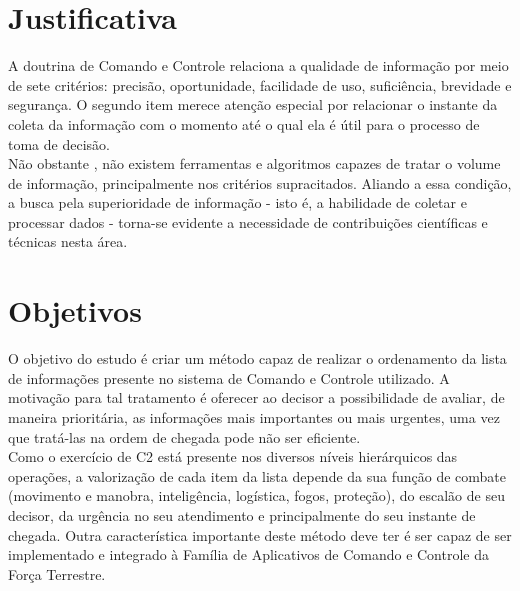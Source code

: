 \documentclass[a4paper,12pt]{article}
\begin{document}
\section{Justificativa}
A doutrina de Comando e Controle \cite{Brasil} relaciona a qualidade de informação por meio de sete critérios: precisão, oportunidade, facilidade de uso,
suficiência, brevidade e segurança. O segundo item merece atenção especial por relacionar o instante da coleta da informação com o momento até o qual ela é 
útil para o processo de toma de decisão.\\
\indent Não obstante \cite{Savas 2014}, não existem ferramentas e algoritmos capazes de tratar o volume de informação, principalmente nos critérios supracitados. 
Aliando a essa condição, a busca pela superioridade de informação - isto é, a habilidade de coletar e processar dados - torna-se evidente a necessidade de
contribuições científicas e técnicas nesta área.

\section{Objetivos}
\indent O objetivo do estudo é criar um método capaz de realizar o ordenamento da lista de informações presente no sistema de 
Comando e Controle utilizado. A motivação para tal tratamento é oferecer ao decisor a possibilidade de avaliar, de maneira 
prioritária, as informações mais importantes ou mais urgentes, uma vez que tratá-las na ordem de chegada pode não ser 
eficiente.\\
\indent Como o exercício de C2 está presente nos diversos níveis hierárquicos das operações, a valorização de cada item 
da lista depende da sua função de combate (movimento e manobra, inteligência, logística, fogos, proteção), do escalão de 
seu decisor, da urgência no seu atendimento e principalmente do seu instante de chegada. Outra característica importante 
deste método deve ter é ser capaz de ser implementado e integrado à Família de Aplicativos de Comando e Controle da 
Força Terrestre.\\
\end{document}
